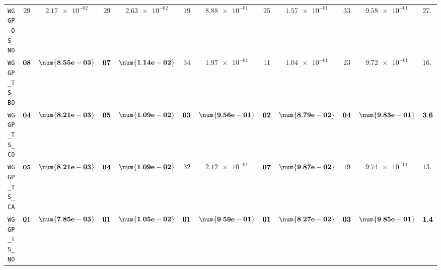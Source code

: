 \begin{table}[H]
\begin{tabularx}{\textwidth}{l||cC|cC|cC|cC|cC||c}
		\texttt{WGGP\_OS\_NO} & $ 29$ & $ \num{2.17e-02}$ & $ 29$ & $ \num{2.63e-02}$ & $ 19$ & $ \num{8.88e-01}$ & $ 25$ & $ \num{1.57e-01}$ & $ 33$ & $ \num{9.58e-01}$ & $ 27.0$  \\
		\texttt{WGGP\_TS\_BO} & $\bf 08$ & $\bf \num{8.55e-03}$ & $\bf 07$ & $\bf \num{1.14e-02}$ & $ 34$ & $ \num{1.97e-01}$ & $ 11$ & $ \num{1.04e-01}$ & $ 23$ & $ \num{9.72e-01}$ & $ 16.6$  \\
		\texttt{WGGP\_TS\_CO} & $\bf 04$ & $\bf \num{8.21e-03}$ & $\bf 05$ & $\bf \num{1.09e-02}$ & $\bf 03$ & $\bf \num{9.56e-01}$ & $\bf 02$ & $\bf \num{8.79e-02}$ & $\bf 04$ & $\bf \num{9.83e-01}$ & $\bf 3.6$  \\
		\texttt{WGGP\_TS\_CA} & $\bf 05$ & $\bf \num{8.21e-03}$ & $\bf 04$ & $\bf \num{1.09e-02}$ & $ 32$ & $ \num{2.12e-01}$ & $\bf 07$ & $\bf \num{9.87e-02}$ & $ 19$ & $ \num{9.74e-01}$ & $ 13.4$  \\
		\texttt{WGGP\_TS\_NO} & $\bf 01$ & $\bf \num{7.85e-03}$ & $\bf 01$ & $\bf \num{1.05e-02}$ & $\bf 01$ & $\bf \num{9.59e-01}$ & $\bf 01$ & $\bf \num{8.27e-02}$ & $\bf 03$ & $\bf \num{9.85e-01}$ & $\bf 1.4$  \\
	\end{tabularx}
\end{table}
